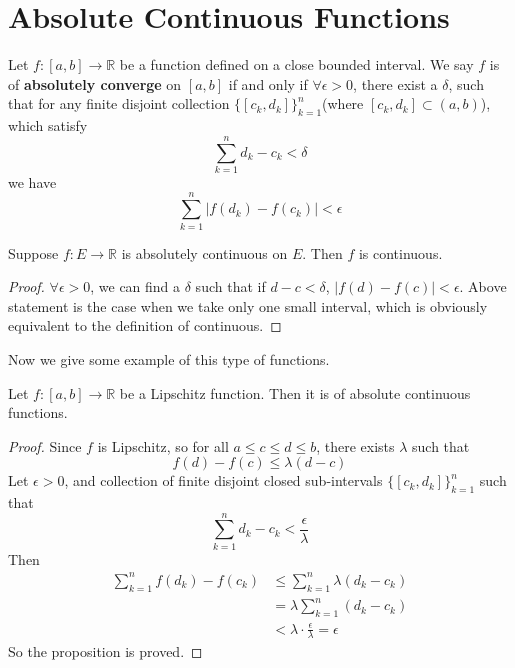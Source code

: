 \documentclass[lang=en, 12pt]{elegantbook}
\newcommand{\RR}{\mathbb{R}}
\begin{document}
    \section{Absolute Continuous Functions}
        \begin{definition}
            Let $f:[a,b] \to \RR$ be a function defined on a close bounded interval. We say $f$ is of \textbf{absolutely converge} on $[a,b]$ if and only 
        if $\forall \epsilon > 0$, there exist a $\delta$, such that for any finite disjoint collection $\{[c_k,d_k]\}_{k=1}^n$(where 
        $[c_k, d_k] \subset (a,b)$), which satisfy 
        \begin{equation*}
            \sum_{k=1}^n d_k -c_k < \delta
        \end{equation*}
        we have 
        \begin{equation*}
            \sum_{k=1}^n |f(d_k) -f(c_k)| < \epsilon
        \end{equation*}
        \end{definition}
        \begin{proposition}
            Suppose $f:E \to \RR$ is absolutely continuous on 
            $E$. Then $f$ is continuous.
        \end{proposition}
        \begin{proof}
            $\forall \epsilon > 0$, we can find a $\delta$ such that
        if $d -c < \delta$, $|f(d) -f(c)| < \epsilon$. Above statement
        is the case when we take only one small interval, which is 
        obviously equivalent to the definition of continuous. 
        \end{proof}
            Now we give some example of this type of functions.
            \begin{proposition}
                Let $f:[a,b] \to \RR$ be a Lipschitz function. Then it is of absolute continuous functions.
            \end{proposition}
            \begin{proof}
                Since $f$ is Lipschitz, so for all $a \leq c \leq d \leq b$, there exists $\lambda$ such that
                $$f(d) - f(c) \leq \lambda (d-c)$$
                Let $\epsilon> 0$, and collection of finite disjoint closed sub-intervals $\{[c_k,d_k]\}_{k=1}^n$ such that 
            $$\sum_{k=1}^n d_k -c_k < \frac{\epsilon}{\lambda}$$ 
                Then
                \begin{equation*}
                    \begin{aligned}
                        \sum_{k=1}^n f(d_k) -f(c_k) &\leq \sum_{k=1}^n \lambda (d_k - c_k)\\
                        &= \lambda \sum_{k=1}^n  (d_k - c_k)\\
                        &< \lambda \cdot \frac{\epsilon}{\lambda} = \epsilon
                    \end{aligned}
                \end{equation*}
                So the proposition is proved. 
            \end{proof}
\end{document}
